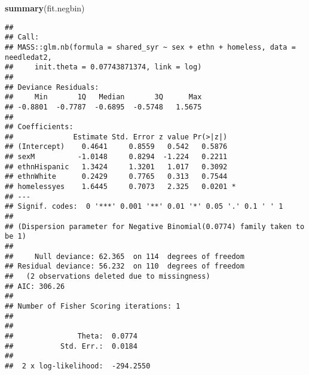 \documentclass[
  ignorenonframetext,
]{beamer}
\newenvironment{Shaded}{\begin{snugshade}}{\end{snugshade}}
\newcommand{\KeywordTok}[1]{\textcolor[rgb]{0.13,0.29,0.53}{\textbf{#1}}}
\newcommand{\NormalTok}[1]{#1}
\begin{document}
\begin{frame}[fragile]{}
\protect\hypertarget{section}{}

\tiny

\begin{Shaded}
\begin{Highlighting}[]
\KeywordTok{summary}\NormalTok{(fit.negbin)}
\end{Highlighting}
\end{Shaded}

\begin{verbatim}
## 
## Call:
## MASS::glm.nb(formula = shared_syr ~ sex + ethn + homeless, data = needledat2, 
##     init.theta = 0.07743871374, link = log)
## 
## Deviance Residuals: 
##     Min       1Q   Median       3Q      Max  
## -0.8801  -0.7787  -0.6895  -0.5748   1.5675  
## 
## Coefficients:
##              Estimate Std. Error z value Pr(>|z|)  
## (Intercept)    0.4641     0.8559   0.542   0.5876  
## sexM          -1.0148     0.8294  -1.224   0.2211  
## ethnHispanic   1.3424     1.3201   1.017   0.3092  
## ethnWhite      0.2429     0.7765   0.313   0.7544  
## homelessyes    1.6445     0.7073   2.325   0.0201 *
## ---
## Signif. codes:  0 '***' 0.001 '**' 0.01 '*' 0.05 '.' 0.1 ' ' 1
## 
## (Dispersion parameter for Negative Binomial(0.0774) family taken to be 1)
## 
##     Null deviance: 62.365  on 114  degrees of freedom
## Residual deviance: 56.232  on 110  degrees of freedom
##   (2 observations deleted due to missingness)
## AIC: 306.26
## 
## Number of Fisher Scoring iterations: 1
## 
## 
##               Theta:  0.0774 
##           Std. Err.:  0.0184 
## 
##  2 x log-likelihood:  -294.2550
\end{verbatim}

\end{frame}
\end{document}
